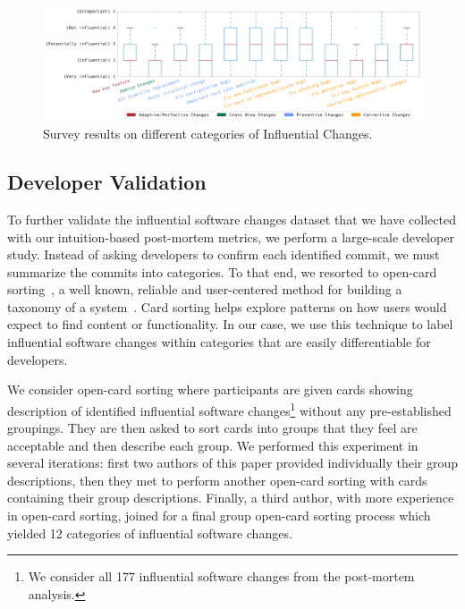 \begin{landscape}
 \begin{figure}
\centering
\includegraphics[width=\linewidth]{fig/response-boxplot.pdf}
\caption{Survey results on different categories of Influential Changes.}
\label{fig:survey}
 \end{figure}
\end{landscape}


\subsection{Developer Validation}
\label{subsec.opencard}

To further validate the influential software changes dataset that we have
collected with our intuition-based post-mortem metrics, we perform a large-scale developer study. Instead of asking developers to confirm each identified
commit, we must summarize the commits into categories. To that end, we
resorted to open-card sorting~\cite{Nielsen95}, a well known, reliable and
user-centered method for building a taxonomy of a system~\cite{boxesandarrows}.
Card sorting helps explore patterns on how users would expect to find content
or functionality. In our case, we use this technique to label influential
software changes within categories that are easily differentiable for
developers.

We consider open-card sorting where participants are given cards showing
description of identified influential software changes\footnote{We consider
all 177 influential software changes from the post-mortem analysis.} without
any pre-established groupings. They are then asked to sort cards into groups
that they feel are acceptable and then describe each group. We performed this
experiment in several iterations: first two authors of this paper provided
individually their group descriptions, then they met to perform another
open-card sorting with cards containing their group descriptions. Finally, a
third author, with more experience in open-card sorting, joined for a final
group open-card sorting process which yielded 12 categories of influential
software changes.


